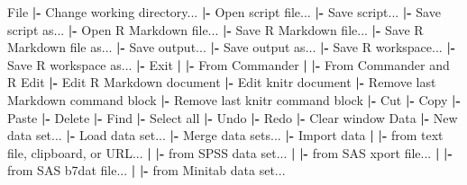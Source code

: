 \documentclass[12pt,]{krantz}
\newenvironment{Shaded}{\begin{snugshade}}{\end{snugshade}}
\newcommand{\ErrorTok}[1]{\textcolor[rgb]{0.64,0.00,0.00}{\textbf{#1}}}
\newcommand{\NormalTok}[1]{#1}
\newcommand{\OperatorTok}[1]{\textcolor[rgb]{0.81,0.36,0.00}{\textbf{#1}}}
\newcommand{\StringTok}[1]{\textcolor[rgb]{0.31,0.60,0.02}{#1}}
\begin{document}
\begin{Shaded}
\begin{Highlighting}[]
\NormalTok{File}
  \OperatorTok{|-}\StringTok{ }\NormalTok{Change working directory...}
  \OperatorTok{|-}\StringTok{ }\NormalTok{Open script file...}
  \OperatorTok{|-}\StringTok{ }\NormalTok{Save script...}
  \OperatorTok{|-}\StringTok{ }\NormalTok{Save script as...}
  \OperatorTok{|-}\StringTok{ }\NormalTok{Open R Markdown file...}
  \OperatorTok{|-}\StringTok{ }\NormalTok{Save R Markdown file...}
  \OperatorTok{|-}\StringTok{ }\NormalTok{Save R Markdown file as...}
  \OperatorTok{|-}\StringTok{ }\NormalTok{Save output...}
  \OperatorTok{|-}\StringTok{ }\NormalTok{Save output as...}
  \OperatorTok{|-}\StringTok{ }\NormalTok{Save R workspace...}
  \OperatorTok{|-}\StringTok{ }\NormalTok{Save R workspace as...}
  \OperatorTok{|-}\StringTok{ }\NormalTok{Exit}
  \OperatorTok{|}\StringTok{ }\ErrorTok{|}\OperatorTok{-}\StringTok{ }\NormalTok{From Commander}
  \OperatorTok{|}\StringTok{ }\ErrorTok{|}\OperatorTok{-}\StringTok{ }\NormalTok{From Commander and R}
\NormalTok{Edit}
  \OperatorTok{|-}\StringTok{ }\NormalTok{Edit R Markdown document}
  \OperatorTok{|-}\StringTok{ }\NormalTok{Edit knitr document}
  \OperatorTok{|-}\StringTok{ }\NormalTok{Remove last Markdown command block}
  \OperatorTok{|-}\StringTok{ }\NormalTok{Remove last knitr command block}
  \OperatorTok{|-}\StringTok{ }\NormalTok{Cut}
  \OperatorTok{|-}\StringTok{ }\NormalTok{Copy}
  \OperatorTok{|-}\StringTok{ }\NormalTok{Paste}
  \OperatorTok{|-}\StringTok{ }\NormalTok{Delete}
  \OperatorTok{|-}\StringTok{ }\NormalTok{Find}
  \OperatorTok{|-}\StringTok{ }\NormalTok{Select all}
  \OperatorTok{|-}\StringTok{ }\NormalTok{Undo}
  \OperatorTok{|-}\StringTok{ }\NormalTok{Redo}
  \OperatorTok{|-}\StringTok{ }\NormalTok{Clear window}
\NormalTok{Data}
  \OperatorTok{|-}\StringTok{ }\NormalTok{New data set...}
  \OperatorTok{|-}\StringTok{ }\NormalTok{Load data set...}
  \OperatorTok{|-}\StringTok{ }\NormalTok{Merge data sets...}
  \OperatorTok{|-}\StringTok{ }\NormalTok{Import data}
  \OperatorTok{|}\StringTok{ }\ErrorTok{|}\OperatorTok{-}\StringTok{ }\NormalTok{from text file, clipboard, or URL...}
  \OperatorTok{|}\StringTok{ }\ErrorTok{|}\OperatorTok{-}\StringTok{ }\NormalTok{from SPSS data set...}
  \OperatorTok{|}\StringTok{ }\ErrorTok{|}\OperatorTok{-}\StringTok{ }\NormalTok{from SAS xport file...}
  \OperatorTok{|}\StringTok{ }\ErrorTok{|}\OperatorTok{-}\StringTok{ }\NormalTok{from SAS b7dat file...}
  \OperatorTok{|}\StringTok{ }\ErrorTok{|}\OperatorTok{-}\StringTok{ }\NormalTok{from Minitab data set...}

\end{Highlighting}
\end{Shaded}
\end{document}
